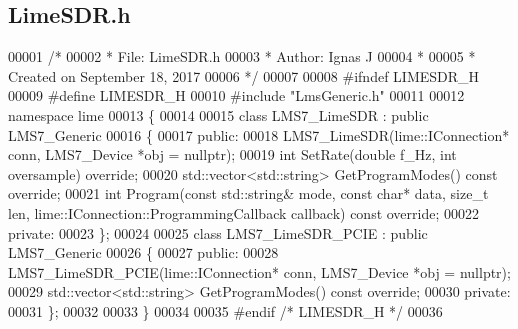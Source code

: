 \subsection{Lime\+S\+D\+R.\+h}
\label{LimeSDR_8h_source}

\begin{DoxyCode}
00001 \textcolor{comment}{/*}
00002 \textcolor{comment}{ * File:   LimeSDR.h}
00003 \textcolor{comment}{ * Author: Ignas J}
00004 \textcolor{comment}{ *}
00005 \textcolor{comment}{ * Created on September 18, 2017}
00006 \textcolor{comment}{ */}
00007 
00008 \textcolor{preprocessor}{#ifndef LIMESDR\_H}
00009 \textcolor{preprocessor}{#define LIMESDR\_H}
00010 \textcolor{preprocessor}{#include "LmsGeneric.h"}
00011 
00012 \textcolor{keyword}{namespace }lime
00013 \{
00014 
00015 \textcolor{keyword}{class }LMS7_LimeSDR : \textcolor{keyword}{public} LMS7_Generic
00016 \{
00017 \textcolor{keyword}{public}:
00018     LMS7_LimeSDR(lime::IConnection* conn, LMS7_Device *obj = \textcolor{keyword}{nullptr});
00019     \textcolor{keywordtype}{int} SetRate(\textcolor{keywordtype}{double} f\_Hz, \textcolor{keywordtype}{int} oversample) \textcolor{keyword}{override};
00020     std::vector<std::string> GetProgramModes() \textcolor{keyword}{const override};
00021     \textcolor{keywordtype}{int} Program(\textcolor{keyword}{const} std::string& mode, \textcolor{keyword}{const} \textcolor{keywordtype}{char}* data, \textcolor{keywordtype}{size\_t} len, 
      lime::IConnection::ProgrammingCallback callback) \textcolor{keyword}{const override};
00022 \textcolor{keyword}{private}:
00023 \};
00024 
00025 \textcolor{keyword}{class }LMS7_LimeSDR_PCIE : \textcolor{keyword}{public} LMS7_Generic
00026 \{
00027 \textcolor{keyword}{public}:
00028     LMS7_LimeSDR_PCIE(lime::IConnection* conn, LMS7_Device *obj = \textcolor{keyword}{nullptr});
00029     std::vector<std::string> GetProgramModes() \textcolor{keyword}{const override};
00030 \textcolor{keyword}{private}:
00031 \};
00032 
00033 \}
00034 
00035 \textcolor{preprocessor}{#endif  }\textcolor{comment}{/* LIMESDR\_H */}\textcolor{preprocessor}{}
00036 
\end{DoxyCode}
